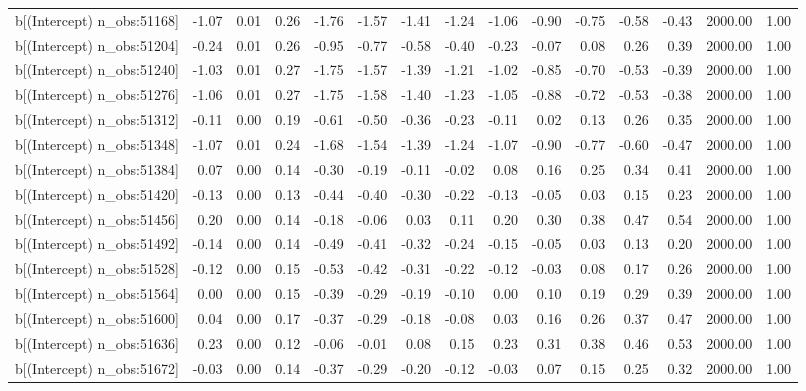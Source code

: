 \begin{table}[ht]
\begin{tabular}{rrrrrrrrrrrrrrr}
  b[(Intercept) n\_obs:51168] & -1.07 & 0.01 & 0.26 & -1.76 & -1.57 & -1.41 & -1.24 & -1.06 & -0.90 & -0.75 & -0.58 & -0.43 & 2000.00 & 1.00 \\ 
  b[(Intercept) n\_obs:51204] & -0.24 & 0.01 & 0.26 & -0.95 & -0.77 & -0.58 & -0.40 & -0.23 & -0.07 & 0.08 & 0.26 & 0.39 & 2000.00 & 1.00 \\ 
  b[(Intercept) n\_obs:51240] & -1.03 & 0.01 & 0.27 & -1.75 & -1.57 & -1.39 & -1.21 & -1.02 & -0.85 & -0.70 & -0.53 & -0.39 & 2000.00 & 1.00 \\ 
  b[(Intercept) n\_obs:51276] & -1.06 & 0.01 & 0.27 & -1.75 & -1.58 & -1.40 & -1.23 & -1.05 & -0.88 & -0.72 & -0.53 & -0.38 & 2000.00 & 1.00 \\ 
  b[(Intercept) n\_obs:51312] & -0.11 & 0.00 & 0.19 & -0.61 & -0.50 & -0.36 & -0.23 & -0.11 & 0.02 & 0.13 & 0.26 & 0.35 & 2000.00 & 1.00 \\ 
  b[(Intercept) n\_obs:51348] & -1.07 & 0.01 & 0.24 & -1.68 & -1.54 & -1.39 & -1.24 & -1.07 & -0.90 & -0.77 & -0.60 & -0.47 & 2000.00 & 1.00 \\ 
  b[(Intercept) n\_obs:51384] & 0.07 & 0.00 & 0.14 & -0.30 & -0.19 & -0.11 & -0.02 & 0.08 & 0.16 & 0.25 & 0.34 & 0.41 & 2000.00 & 1.00 \\ 
  b[(Intercept) n\_obs:51420] & -0.13 & 0.00 & 0.13 & -0.44 & -0.40 & -0.30 & -0.22 & -0.13 & -0.05 & 0.03 & 0.15 & 0.23 & 2000.00 & 1.00 \\ 
  b[(Intercept) n\_obs:51456] & 0.20 & 0.00 & 0.14 & -0.18 & -0.06 & 0.03 & 0.11 & 0.20 & 0.30 & 0.38 & 0.47 & 0.54 & 2000.00 & 1.00 \\ 
  b[(Intercept) n\_obs:51492] & -0.14 & 0.00 & 0.14 & -0.49 & -0.41 & -0.32 & -0.24 & -0.15 & -0.05 & 0.03 & 0.13 & 0.20 & 2000.00 & 1.00 \\ 
  b[(Intercept) n\_obs:51528] & -0.12 & 0.00 & 0.15 & -0.53 & -0.42 & -0.31 & -0.22 & -0.12 & -0.03 & 0.08 & 0.17 & 0.26 & 2000.00 & 1.00 \\ 
  b[(Intercept) n\_obs:51564] & 0.00 & 0.00 & 0.15 & -0.39 & -0.29 & -0.19 & -0.10 & 0.00 & 0.10 & 0.19 & 0.29 & 0.39 & 2000.00 & 1.00 \\ 
  b[(Intercept) n\_obs:51600] & 0.04 & 0.00 & 0.17 & -0.37 & -0.29 & -0.18 & -0.08 & 0.03 & 0.16 & 0.26 & 0.37 & 0.47 & 2000.00 & 1.00 \\ 
  b[(Intercept) n\_obs:51636] & 0.23 & 0.00 & 0.12 & -0.06 & -0.01 & 0.08 & 0.15 & 0.23 & 0.31 & 0.38 & 0.46 & 0.53 & 2000.00 & 1.00 \\ 
  b[(Intercept) n\_obs:51672] & -0.03 & 0.00 & 0.14 & -0.37 & -0.29 & -0.20 & -0.12 & -0.03 & 0.07 & 0.15 & 0.25 & 0.32 & 2000.00 & 1.00 \\ 

\end{tabular}
\end{table}
